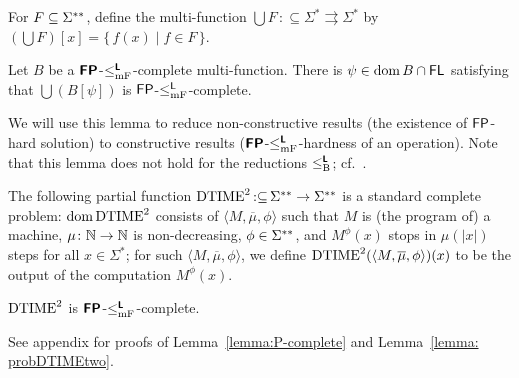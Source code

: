 \documentclass[envcountsame,orivec,oribibl]{llncs}
\newcommand{\pcolon}{\mathpunct{\,:\subseteq}}
\begin{document}
For $F \subseteq \Sigma ^{**}$, 
define the multi-function $\bigcup F \pcolon \Sigma ^* \rightrightarrows \Sigma ^*$ by
$(\bigcup F) [x] = \{\, f(x) \mid f \in F \,\}$.

\begin{lemma}
\label{lemma:P-complete}
Let $B$ be a $\text{\bfseries \sffamily \upshape FP}$-$\leq _{\mathrm{mF}} ^{\text{\bfseries \sffamily \upshape L}}$-complete multi-function.
There is $\psi \in \mathop{\rm dom} B \cap \mathsf{FL}$ satisfying that
 $\bigcup (B[\psi])$ is $\mathsf{FP}$-$\le^{\mathsf{L}}_{\mathrm{mF}}$-complete.
\end{lemma}

We will use this lemma to reduce 
non-constructive results (the existence of $\mathsf{FP}$-hard solution) to
constructive results ($\text{\bfseries \sffamily \upshape FP}$-$\leq _{\mathrm{mF}} ^{\text{\bfseries \sffamily \upshape L}}$-hardness of an operation).
Note that this lemma does not hold for
the reductions $\leq _{\mathrm B} ^{\text{\bfseries \sffamily \upshape L}}$; cf.~\cite[Lemma~3.6]{kawamura2012complexity}.

The following partial function $\probDTIMEtwo \pcolon \LM \to \LM$ 
is a standard complete problem: 
$\mathop{\rm dom} \mathrm{DTIME}^2$ consists of $\langle M, \overline \mu, \phi \rangle$
such that $M$ is (the program of) a machine, 
$\mu \colon \mathbb N \to \mathbb N$ is non-decreasing, 
$\phi \in \Sigma ^{**}$, 
and $M^\phi(x)$ stops in $\mu(|x|)$ steps for all $x \in \Sigma^*$; 
for such $\langle M, \overline \mu, \phi \rangle$, 
we define $\mathrm{DTIME}^2(\langle M, \overline \mu, \phi \rangle)(x)$ to be 
the output of the computation $M^\phi(x)$.

\begin{lemma}
\label{lemma: probDTIMEtwo}
 $\mathrm{DTIME}^2$ is $\text{\bfseries \sffamily \upshape FP}$-$\leq _{\mathrm{mF}} ^{\text{\bfseries \sffamily \upshape L}}$-complete.
\end{lemma}




See appendix for 
proofs of Lemma~\ref{lemma:P-complete} and Lemma~\ref{lemma: probDTIMEtwo}. 
\end{document}

